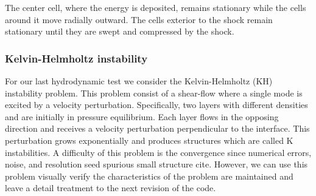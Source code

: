 The center cell, where the energy is deposited, remains stationary while the
cells around it move radially outward. The cells exterior to the shock remain
stationary until they are swept and compressed by the shock.

\subsubsection{Kelvin-Helmholtz instability}
For our last hydrodynamic test we consider the Kelvin-Helmholtz (KH) instability problem. This
problem consist of a shear-flow where a single mode is excited by a velocity perturbation.
Specifically, two layers with different densities and are initially in pressure equilibrium. 
Each layer flows in the opposing direction and receives a velocity perturbation perpendicular to the 
interface. This perturbation grows exponentially and produces structures which
are called K instabilities. A difficulty of this problem is the convergence
since numerical errors, noise, and resolution seed spurious small structure cite. However,
we can use this problem visually verify the characteristics of the problem are maintained
and leave a detail treatment to the next revision of the code.

